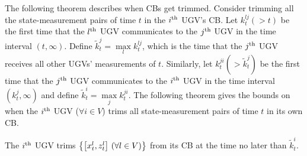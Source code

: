 	The following theorem describes when CBs get trimmed.
	Consider trimming all the state-measurement pairs of time $t$ in the $i^\text{th}$ UGV's CB.
	Let $k^{lj}_t (>t)$ be the first time that the $l^\text{th}$ UGV communicates to the $j^\text{th}$ UGV in the time interval $(t,\infty)$.
	Define $\tilde{k}^j_t=\max\limits_l k^{lj}_t$, which is the time that the $j^\text{th}$ UGV receives all other UGVs' measurements of $t$.
	Similarly, let $k^{ji}_t (> \tilde{k}^j_t)$ be the first time that the $j^\text{th}$ UGV communicates to the $i^\text{th}$ UGV in the time interval $(k^j_t,\infty)$ and define $\tilde{k}^i_t=\max\limits_j k^{ji}_t$.
	The following theorem gives the bounds on when the $i^\text{th}$ UGV ($\forall i\in V$) trims all state-measurement pairs of time $t$ in its own CB.
	\begin{thm}\label{thm:upd_tl_freq}		
		The $i^\text{th}$ UGV trims $\left\lbrace\left[x^l_t,z^l_t\right] \,(\forall l\in V)\right\rbrace$ from its CB at the time no later than $\tilde{k}^i_t$.
	\end{thm}
	
